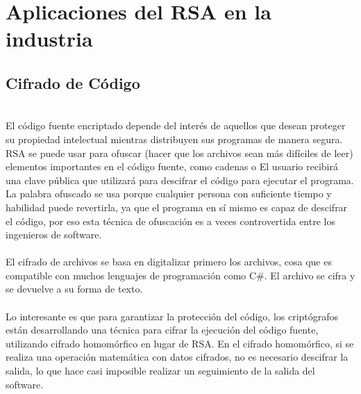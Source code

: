 \documentclass[12pt, a4paper]{article}
\begin{document}
	\section{Aplicaciones del RSA en la industria}



	\subsection{Cifrado de Código}
	\\El código fuente encriptado depende del interés de aquellos que desean proteger su propiedad intelectual mientras distribuyen sus programas de manera segura. RSA se puede usar para ofuscar (hacer que los archivos sean más difíciles de leer) elementos importantes en el código fuente, como cadenas o El usuario recibirá una clave pública que utilizará para descifrar el código para ejecutar el programa. La palabra ofuscado se usa porque cualquier persona con suficiente tiempo y habilidad puede revertirla, ya que el programa en sí mismo es capaz de descifrar el código, por eso esta técnica de ofuscación es a veces controvertida entre los ingenieros de software.
	\\
	\\El cifrado de archivos se basa en digitalizar primero los archivos, cosa que es compatible con muchos lenguajes de programación como C\#. El archivo se cifra y se devuelve a su forma de texto.
	\\
	\\Lo interesante es que para garantizar la protección del código, los criptógrafos están desarrollando una técnica para cifrar la ejecución del código fuente, utilizando cifrado homomórfico en lugar de RSA. En el cifrado homomórfico, si se realiza una operación matemática con datos cifrados, no es necesario descifrar la salida, lo que hace casi imposible realizar un seguimiento de la salida del software.
\end{document}
